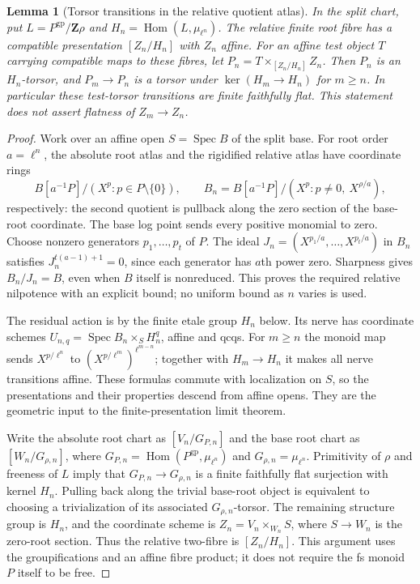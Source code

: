 \documentclass[11pt]{article}
\newtheorem{lemma}[theorem]{Lemma}
\theoremstyle{definition}
\theoremstyle{remark}
\begin{document}
\begin{lemma}[Torsor transitions in the relative quotient atlas]
\label{lem:frag-relative-atlas-torsors}
In the split chart, put $L=P^{\mathrm{gp}}/\mathbf Z\rho$ and
$H_n=\operatorname{Hom}(L,\mu_{\ell^n})$.  The relative finite root
fibre has a compatible presentation $[Z_n/H_n]$ with $Z_n$ affine.
For an affine test object $T$ carrying compatible maps to these fibres,
let $P_n=T\times_{[Z_n/H_n]}Z_n$.  Then $P_n$ is an $H_n$-torsor,
and $P_m\to P_n$ is a torsor under $\ker(H_m\to H_n)$ for $m\geq n$.
In particular these test-torsor transitions are finite faithfully flat.
This statement does not assert flatness of $Z_m\to Z_n$.
\end{lemma}

\begin{proof}
Work over an affine open $S=\operatorname{Spec}B$ of the split base.
For root order $a=\ell^n$, the absolute root atlas and the rigidified
relative atlas have coordinate rings
\[
 B[a^{-1}P]/(X^p:p\in P\setminus\{0\}),\qquad
 B_n=B[a^{-1}P]/(X^p:p\ne0,\ X^{\rho/a}),
\]
respectively: the second quotient is pullback along the zero section
of the base-root coordinate.  The base log point sends every positive
monomial to zero.  Choose nonzero generators $p_1,\ldots,p_t$ of $P$.
The ideal $J_n=(X^{p_1/a},\ldots,X^{p_t/a})$ in $B_n$ satisfies
$J_n^{t(a-1)+1}=0$, since each generator has $a$th power zero.
Sharpness gives $B_n/J_n=B$, even when $B$ itself is nonreduced.
This proves the required relative nilpotence with an explicit bound;
no uniform bound as $n$ varies is used.

The residual action is by the finite etale group $H_n$ below.
Its nerve has coordinate schemes
$U_{n,q}=\operatorname{Spec}B_n\times_S H_n^q$, affine and qcqs.
For $m\ge n$ the monoid map sends $X^{p/\ell^n}$ to
$(X^{p/\ell^m})^{\ell^{m-n}}$; together with $H_m\to H_n$ it
makes all nerve transitions affine.  These formulas commute with
localization on $S$, so the presentations and their properties
descend from affine opens.  They are the geometric input to the
finite-presentation limit theorem.

Write the absolute root chart as $[V_n/G_{P,n}]$ and the base root
chart as $[W_n/G_{\rho,n}]$, where
$G_{P,n}=\operatorname{Hom}(P^{\mathrm{gp}},\mu_{\ell^n})$ and
$G_{\rho,n}=\mu_{\ell^n}$.  Primitivity of $\rho$ and freeness of
$L$ imply that $G_{P,n}\to G_{\rho,n}$ is a finite faithfully flat
surjection with kernel $H_n$.  Pulling back along the trivial base-root
object is equivalent to choosing a trivialization of its associated
$G_{\rho,n}$-torsor.  The remaining structure group is $H_n$, and the
coordinate scheme is $Z_n=V_n\times_{W_n}S$, where $S\to W_n$ is
the zero-root section.  Thus the relative two-fibre is $[Z_n/H_n]$.
This argument uses the groupifications and an affine fibre product;
it does not require the fs monoid $P$ itself to be free.


\end{proof}
\end{document}
